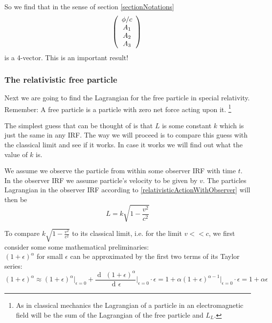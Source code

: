 \documentclass{article}
\DeclareMathOperator{\dd}{d\!}
\begin{document}
So we find that in the sense of section \ref{sectionNotations}
\begin{equation}
    \left(\begin{array}{c}
              \phi / c \\
              A_1\\
              A_2\\
              A_3\\
    \end{array} \right) \nonumber \\
\end{equation}
is a 4-vector.
This is an important result!


\subsubsection{The relativistic free particle} \label{sectionRelativisticFreeParticle}
Next we are going to find the Lagrangian for the free particle in special relativity.
Remember: A free particle is a particle with zero net force acting upon it.
\footnote{As in classical mechanics the Lagrangian of a particle in an electromagnetic field will be the sum of the Lagrangian of the free particle and $L_L$.}

The simplest guess that can be thought of is that $L$ is some constant $k$ which is just the same in any IRF.
The way we will proceed is to compare this guess with the classical limit and see if it works.
In case it works we will find out what the value of $k$ is.

We assume we observe the particle from within some observer IRF with time $t$.
In the observer IRF we assume particle's velocity to be given by $v$.
The particles Lagrangian in the observer IRF according to \ref{relativisticActionWithObserver} will then be
\begin{equation}
    L = k \sqrt{1-\frac{v^2}{c^2}}
\end{equation}

To compare $k \sqrt{1 - \frac{v^2}{c^2}}$ to its classical limit, i.e. for the limit $v << c$, we first consider some some mathematical preliminaries:\\

$(1+\epsilon)^\alpha$ for small $\epsilon$ can be approximated by the first two terms of its Taylor series:
\begin{equation}
    (1+\epsilon)^\alpha
    \approx (1+\epsilon)^\alpha \Big|_{\epsilon = 0}
    + \frac{\dd \; (1+\epsilon)^\alpha}{\dd \epsilon}\Big|_{\epsilon = 0} \cdot \epsilon
    = 1 + \alpha (1+\epsilon)^{\alpha -1} \Big|_{\epsilon = 0} \cdot \epsilon
    = 1 + \alpha \epsilon
\end{equation}
\end{document}
